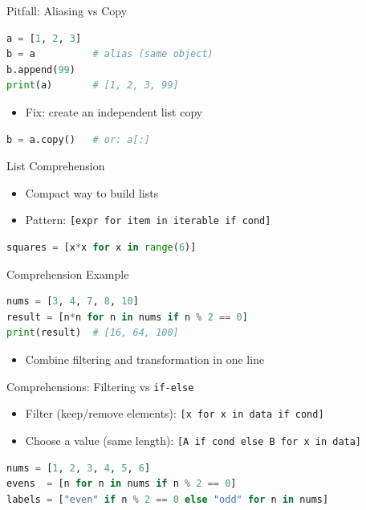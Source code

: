 \documentclass{beamer}
\begin{document}
\begin{frame}[fragile]{Pitfall: Aliasing vs Copy}
  \begin{lstlisting}[language=Python]
a = [1, 2, 3]
b = a          # alias (same object)
b.append(99)
print(a)       # [1, 2, 3, 99]
  \end{lstlisting}
  \begin{itemize}[<+->]
    \item Fix: create an independent list copy
  \end{itemize}
  \begin{lstlisting}[language=Python]
b = a.copy()   # or: a[:]
  \end{lstlisting}
\end{frame}

\begin{frame}[fragile]{List Comprehension}
  \begin{itemize}[<+->]
    \item Compact way to build lists
    \item Pattern: \texttt{[expr for item in iterable if cond]}
  \end{itemize}
  \vspace{0.4em}
  \begin{lstlisting}[language=Python]
squares = [x*x for x in range(6)]
  \end{lstlisting}
\end{frame}

\begin{frame}[fragile]{Comprehension Example}
  \begin{lstlisting}[language=Python]
nums = [3, 4, 7, 8, 10]
result = [n*n for n in nums if n % 2 == 0]
print(result)  # [16, 64, 100]
  \end{lstlisting}
  \begin{itemize}[<+->]
    \item Combine filtering and transformation in one line
  \end{itemize}
\end{frame}

\begin{frame}[fragile]{Comprehensions: Filtering vs \texttt{if-else}}
  \begin{itemize}[<+->]
    \item Filter (keep/remove elements): \texttt{[x for x in data if cond]}
    \item Choose a value (same length): \texttt{[A if cond else B for x in data]}
  \end{itemize}
  \vspace{0.3em}
  \begin{lstlisting}[language=Python]
nums = [1, 2, 3, 4, 5, 6]
evens  = [n for n in nums if n % 2 == 0]
labels = ["even" if n % 2 == 0 else "odd" for n in nums]
  \end{lstlisting}
\end{frame}
\end{document}
